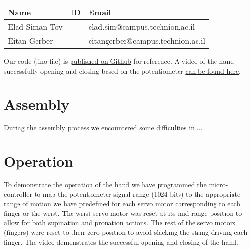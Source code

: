 \documentclass[10pt]{article}
\begin{document}
\begin{table}[h]
    \centering
    \begin{tabular}{l l l}
        \hline
        Name & ID & Email \\
        \hline
        Elad Siman Tov & - & elad.sim@campus.technion.ac.il \\
        \hline
        Eitan Gerber & - & eitangerber@campus.technion.ac.il \\
        \hline
    \end{tabular}
    \label{tab:personal_info}
\end{table}
\noindent Our code (.ino file) is \href{https://github.com/eladsimantov/Wearable-Robotics/blob/main/Final%20Project/Potentiometer_Servos.ino}{published on Github} for reference.
A video of the hand successfully opening and closing based on the potentiometer \href{https://technionmail-my.sharepoint.com/:v:/g/personal/eitangerber_campus_technion_ac_il/Ead1dbEn8xNEuNcpJJbua7sBZmVPV9wEbOwiU09-S7oXpg?e=Y54jJX}{can be found here}.

\section*{Assembly}
During the assembly process we encountered some difficulties in ...

\section*{Operation}
To demonstrate the operation of the hand we have programmed the micro-controller to map the potentiometer signal range (1024 bits) to the appropriate range of motion we have predefined for each servo motor corresponding to each finger or the wrist. 
The wrist servo motor was reset at its mid range position to allow for both supination and pronation actions. The rest of the servo motors (fingers) were reset to their zero position to avoid slacking the string driving each finger.
The video demonstrates the successful opening and closing of the hand. 
\end{document}
